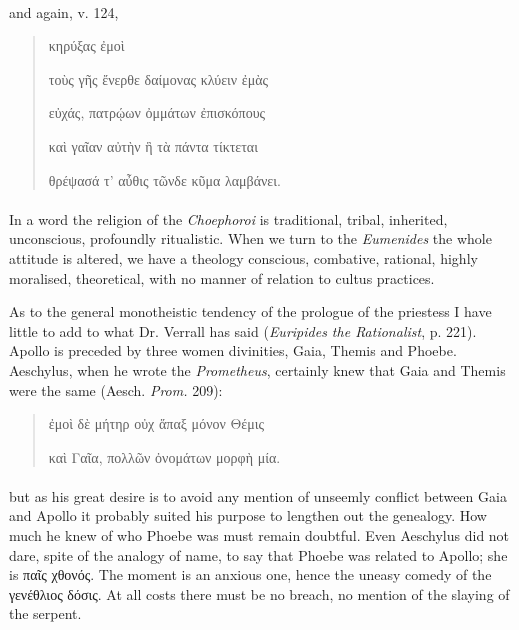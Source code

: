 \documentclass[a4paper, 11pt, oneside, polutonikogreek, english]{article}
\begin{document}
\paragraph{}
and again, v. 124,
\begin{quotation}
\hspace*{20mm}κηρύξας ἐμοὶ

τοὺς γῆς ἔνερθε δαίμονας κλύειν ἐμὰς

εὐχάς, πατρῴων ὀμμάτων ἐπισκόπους

καὶ γαῖαν αὐτὴν ἣ τὰ πάντα τίκτεται

θρέψασά τ' αὖθις τῶνδε κῦμα λαμβάνει.
\end{quotation}
\paragraph{}
In a word the religion of the \emph{Choephoroi} is traditional, tribal, inherited, unconscious, profoundly ritualistic. When we turn to the \emph{Eumenides} the whole attitude is altered, we have a theology conscious, combative, rational, highly moralised, theoretical, with no manner of relation to cultus practices.

As to the general monotheistic tendency of the prologue of the priestess I have little to add to what Dr. Verrall has said (\emph{Euripides the Rationalist}, p. 221). Apollo is preceded by three women divinities, Gaia, Themis and Phoebe. Aeschylus, when he wrote the \emph{Prometheus}, certainly knew that Gaia and Themis were the same (Aesch. \emph{Prom.} 209):
\begin{quotation}
ἐμοὶ δὲ μήτηρ οὐχ ἅπαξ μόνον Θέμις

καὶ Γαῖα, πολλῶν ὀνομάτων μορφὴ μία.
\end{quotation}
\paragraph{}
but as his great desire is to avoid any mention of unseemly conflict between Gaia and Apollo it probably suited his purpose to lengthen out the genealogy. How much he knew of who Phoebe was must remain doubtful. Even Aeschylus did not dare, spite of the analogy of name, to say that Phoebe was related to Apollo; she is παῖς χθονός. The moment is an anxious one, hence the uneasy comedy of the γενέθλιος δόσις. At all costs there must be no breach, no mention of the slaying of the serpent.
\end{document}
